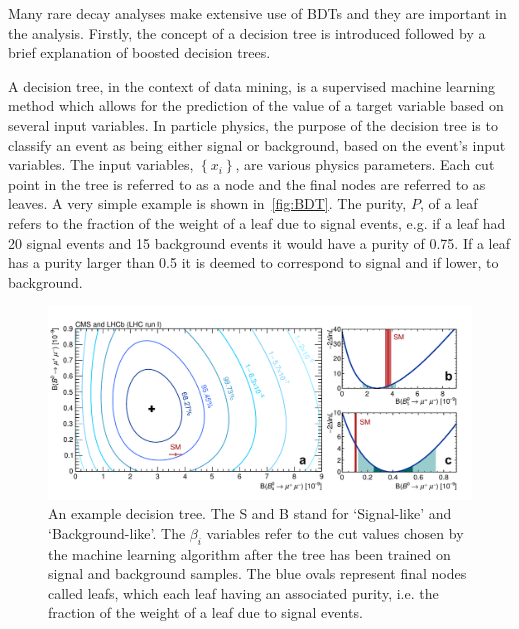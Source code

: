 \label{app:bdt}

Many rare decay analyses make extensive use of BDTs and they are important in the \Lbpi analysis. Firstly, the concept of a decision tree is introduced followed by a brief explanation of boosted decision trees.

A decision tree, in the context of data mining, is a supervised machine learning method which allows for the prediction of the value of a target variable based on several input variables. In particle physics, the purpose of the decision tree is to classify an event as being either signal or background, based on the event's input variables. The input variables, $\left\{x_{i}\right\}$, are various physics parameters. %
Each cut point in the tree is referred to as a node and the final nodes are referred to as leaves. A very simple example is shown in~\autoref{fig:BDT}. The purity, $P$, of a leaf refers to the fraction of the weight of a leaf due to signal events, e.g. if a leaf had 20 signal events and 15 background events it would have a purity of 0.75. If a leaf has a purity larger than 0.5 it is deemed to correspond to signal and if lower, to background.
\begin{figure}
  \centering
  \includegraphics[scale = 0.7]{figs/BDT.png}
  \caption{An example decision tree. The S and B stand for `Signal-like' and `Background-like'. The $\beta_{i}$ variables refer to the cut values chosen by the machine learning algorithm after the tree has been trained on signal and background samples. The blue ovals represent final nodes called leafs, which each leaf having an associated purity, i.e. the fraction of the weight of a leaf due to signal events.}
  \label{fig:BDT}
\end{figure}


